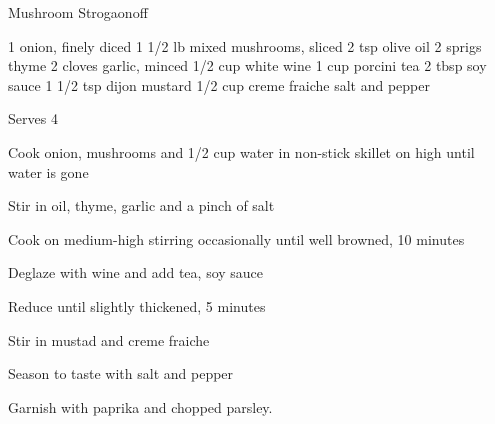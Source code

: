 \begin{denserecipe}{Mushroom Strogaonoff}{\vegetarian{}}
\begin{ingredients}
1 onion, finely diced
1 1/2 lb mixed mushrooms, sliced
2 tsp olive oil
2 sprigs thyme
2 cloves garlic, minced
1/2 cup white wine
1 cup porcini tea
2 tbsp soy sauce
1 1/2 tsp dijon mustard
1/2 cup creme fraiche
salt and pepper
\end{ingredients}
\nextcolumn
Serves 4
\begin{steps}
    \item Cook onion, mushrooms and 1/2 cup water in non-stick skillet on high until water is gone
    \item Stir in oil, thyme, garlic and a pinch of salt
    \item Cook on medium-high stirring occasionally until well browned, 10 minutes
    \item Deglaze with wine and add tea, soy sauce
    \item Reduce until slightly thickened, 5 minutes
    \item Stir in mustad and creme fraiche
    \item Season to taste with salt and pepper
\end{steps}
Garnish with paprika and chopped parsley.
\end{denserecipe}

